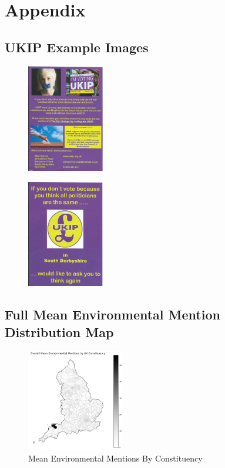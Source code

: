 \documentclass[preprint]{elsarticle} %
\begin{document}
 



\newpage


\section{Appendix}


\subsection{UKIP Example Images}


\begin{figure}[H]
	\centering
	\includegraphics[width=0.3\textwidth]{28_1.jpg}
	\caption{}
	\label{fig:28_1}
\end{figure}

\begin{figure}[H]
	\centering
	\includegraphics[width=0.3\textwidth]{28_2.jpg}
	\caption{}
	\label{fig:28_2}
\end{figure}





\subsection{Full Mean Environmental Mention Distribution Map}

\begin{figure}[H]
	\centering
	\includegraphics[width=0.38\textwidth]{plots/Overall_Environmental_Mentions.png}
	\caption{Mean Environmental Mentions By Constituency}
	\label{fig:meanenvbyconold}
\end{figure}
\end{document}
